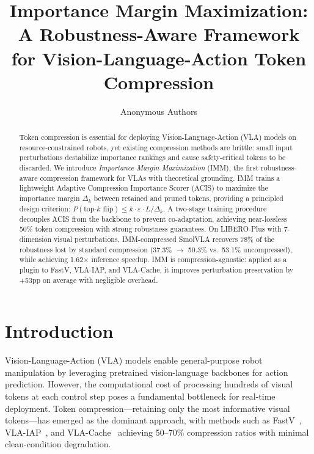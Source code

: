 \documentclass[conference]{corl_2026}
\title{Importance Margin Maximization: A Robustness-Aware Framework\\for Vision-Language-Action Token Compression}
\author{
  Anonymous Authors
}
\newcommand{\ours}{IMM}
\newcommand{\acis}{ACIS}
\newcommand{\deltak}{\Delta_k}
\begin{document}
\maketitle

\begin{abstract}
Token compression is essential for deploying Vision-Language-Action (VLA) models on resource-constrained robots, yet existing compression methods are brittle: small input perturbations destabilize importance rankings and cause safety-critical tokens to be discarded.
We introduce \emph{Importance Margin Maximization} (\ours{}), the first robustness-aware compression framework for VLAs with theoretical grounding.
\ours{} trains a lightweight Adaptive Compression Importance Scorer (\acis{}) to maximize the importance margin $\deltak$ between retained and pruned tokens, providing a principled design criterion: $P(\text{top-}k\text{ flip}) \leq k \cdot \varepsilon \cdot L / \deltak$.
A two-stage training procedure decouples \acis{} from the backbone to prevent co-adaptation, achieving near-lossless 50\% token compression with strong robustness guarantees.
On LIBERO-Plus with 7-dimension visual perturbations, \ours{}-compressed SmolVLA recovers 78\% of the robustness lost by standard compression (37.3\% $\rightarrow$ 50.3\% vs.\ 53.1\% uncompressed), while achieving 1.62$\times$ inference speedup.
\ours{} is compression-agnostic: applied as a plugin to FastV, VLA-IAP, and VLA-Cache, it improves perturbation preservation by +53pp on average with negligible overhead.
\end{abstract}

\section{Introduction}
\label{sec:intro}

Vision-Language-Action (VLA) models enable general-purpose robot manipulation by leveraging pretrained vision-language backbones for action prediction. However, the computational cost of processing hundreds of visual tokens at each control step poses a fundamental bottleneck for real-time deployment.
Token compression---retaining only the most informative visual tokens---has emerged as the dominant approach, with methods such as FastV~\cite{fastv}, VLA-IAP~\cite{vlaiap}, and VLA-Cache~\cite{vlacache} achieving 50--70\% compression ratios with minimal clean-condition degradation.
\end{document}
